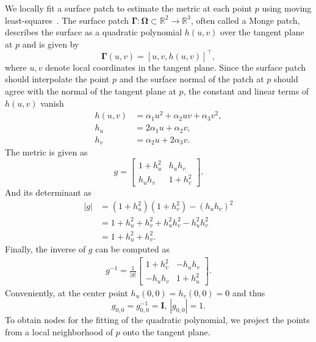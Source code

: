 \documentclass[acmtog, authorversion]{acmart}
\newcommand{\g}{\mathbf{\Gamma}}
\begin{document}
We locally fit a surface patch to estimate the metric at each point $p$ using moving least-squares~\cite{Nealen2004}.
The surface patch $\g : \mathbf{\Omega} \subset \mathbb{R}^2 \rightarrow \mathbb{R}^3$, often called a Monge patch, describes the surface as a quadratic polynomial $h(u,v)$ over the tangent plane at $p$ and is given by \begin{equation}
    \g(u, v) = \left[u, v, h(u, v)\right]^\intercal,
\end{equation} 
where $u, v$ denote local coordinates in the tangent plane. Since the surface patch should interpolate the point $p$ and the surface normal of the patch at $p$ should agree with the normal of the tangent plane at $p$, the constant and linear terms of $h(u,v)$ vanish
\begin{align}
    h(u, v) &= \alpha_1 u^2 + \alpha_2 uv + \alpha_3 v^2, \\
    h_u &= 2\alpha_1 u + \alpha_2 v, \\
    h_v &= \alpha_2 u + 2\alpha_3 v.
\end{align}
The metric is given as
\begin{equation}
    g = 
    \begin{bmatrix}
        1 + h_u^2 & h_u h_v \\
        h_u h_v & 1 + h_v^2
    \end{bmatrix}.
\end{equation}
And its determinant as
\begin{align}
    |g| &= (1 + h_u^2)(1 + h_v^2) - (h_u h_v)^2 \\
    &= 1 + h_u^2 + h_v^2 + h_u^2 h_v^2 - h_u^2h_v^2 \\
    &= 1 + h_u^2 + h_v^2.
\end{align}
Finally, the inverse of $g$ can be computed as
\begin{align}
    g^{-1} = \frac{1}{|g|} 
    \begin{bmatrix}
        1 + h_v^2 & -h_u h_v \\
        -h_u h_v & 1 + h_u^2
    \end{bmatrix}.
\end{align}
Conveniently, at the center point $h_u(0, 0) = h_v(0, 0) = 0$ and thus
\begin{equation}
    g_{0, 0} = g^{-1}_{0, 0} = \mathbf{I}, \, |g_{0, 0}| = 1.
    \label{eq:metricidentity}
\end{equation}
To obtain nodes for the fitting of the quadratic polynomial, we project the points from a local neighborhood of $p$ onto the tangent plane.
\end{document}
